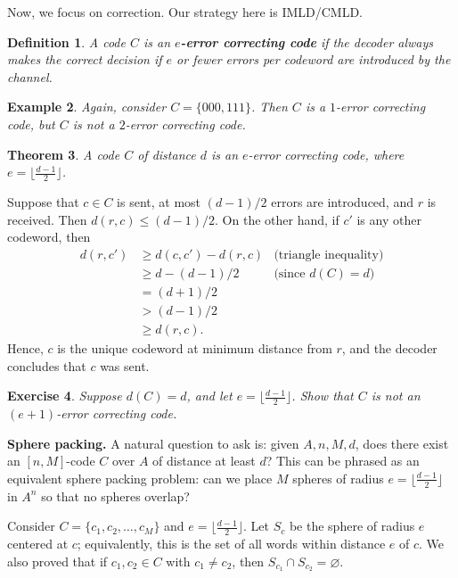 \documentclass[10pt]{article}
\makeatletter
\theoremstyle{newstyle}
\newtheorem{thm}{Theorem}[subsection]
\newtheorem{defn}[thm]{Definition}
\newtheorem{exercise}[thm]{Exercise}
\newtheorem{exmp}[thm]{Example}
\newenvironment{pf}[1][\proofname]{\par
  \pushQED{\qed}%
  \normalfont \topsep0\p@\relax
  \trivlist
  \item[\hskip\labelsep\scshape
  #1\@addpunct{.}]\ignorespaces
}{%
  \popQED\endtrivlist\@endpefalse
}
\makeatother
\begin{document}
Now, we focus on correction. Our strategy here is IMLD/CMLD. 

\begin{defn}
A code $C$ is an {\bf $e$-error correcting code} if the decoder always makes the correct decision
if $e$ or fewer errors per codeword are introduced by the channel. 
\end{defn}

\begin{exmp}
Again, consider $C = \{000, 111\}$. Then $C$ is a $1$-error correcting code, but 
$C$ is not a $2$-error correcting code. 
\end{exmp}

\begin{thm}
A code $C$ of distance $d$ is an $e$-error correcting code, where $e = \lfloor \frac{d-1}2 \rfloor$. 
\end{thm}
\begin{pf}
Suppose that $c \in C$ is sent, at most $(d-1)/2$ errors are introduced, and $r$ is received. 
Then $d(r, c) \leq (d-1)/2$. On the other hand, if $c'$ is any other codeword, then 
\begin{align*}
    d(r, c') &\geq d(c, c') - d(r, c) & \text{(triangle inequality)} \\
    &\geq d - (d-1)/2 & \text{(since $d(C) = d$)} \\
    &= (d+1)/2 \\ 
    &> (d-1)/2 \\ 
    &\geq d(r, c).
\end{align*}
Hence, $c$ is the unique codeword at minimum distance from $r$, and the decoder
concludes that $c$ was sent.
\end{pf}

\begin{exercise}
Suppose $d(C) = d$, and let $e = \lfloor \frac{d-1}2 \rfloor$. Show that $C$ is not 
an $(e+1)$-error correcting code. 
\end{exercise}

{\bf Sphere packing.} A natural question to ask is: given $A, n, M, d$, does there exist 
an $[n, M]$-code $C$ over $A$ of distance at least $d$? This can be phrased as an 
equivalent sphere packing problem: can we place $M$ spheres of radius $e = \lfloor 
\frac{d-1}2 \rfloor$ in $A^n$ so that no spheres overlap?

Consider $C = \{c_1, c_2, \dots, c_M\}$ and $e = \lfloor \frac{d-1}2 \rfloor$. Let 
$S_c$ be the sphere of radius $e$ centered at $c$; equivalently, this is the 
set of all words within distance $e$ of $c$. We also proved that if $c_1, c_2 \in C$ 
with $c_1 \neq c_2$, then $S_{c_1} \cap S_{c_2} = \varnothing$. 
\end{document}
